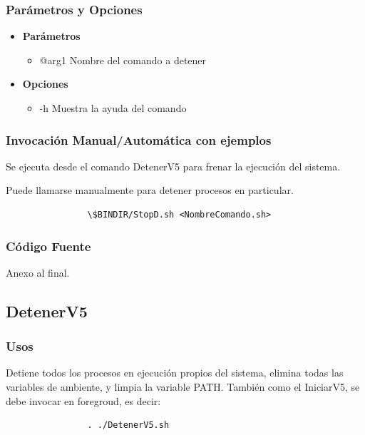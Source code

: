 \documentclass[a4paper,10pt,titlepage]{article}
\begin{document}
		\subsubsection{Par\'ametros y Opciones}
			\begin {itemize}
				\item \textbf{Par\'ametros} {
					\begin{itemize}
						\item {@arg1 }{Nombre del comando a detener}
					\end{itemize}
				}
				\item \textbf{Opciones}{
					\begin{itemize}
						\item {-h }{Muestra la ayuda del comando} 
					\end{itemize}
				}

			\end{itemize}
	
		\subsubsection{Invocaci\'on Manual/Autom\'atica con ejemplos}
			Se ejecuta desde el comando DetenerV5 para frenar la ejecuci\'on del sistema. 
	
			 Puede llamarse manualmente para detener procesos en particular.

			\begin{verbatim}
				\$BINDIR/StopD.sh <NombreComando.sh>
			\end{verbatim}


		\subsubsection{C\'odigo Fuente}
			Anexo al final.

	\subsection{DetenerV5}
		\subsubsection{Usos}
			Detiene todos los procesos en ejecuci\'on propios del sistema, elimina todas las variables de ambiente, y limpia la variable PATH.
			Tambi\'en como el IniciarV5, se debe invocar en foregroud, es decir:

			\begin{verbatim}
				. ./DetenerV5.sh
			\end{verbatim}
		
\end{document}
